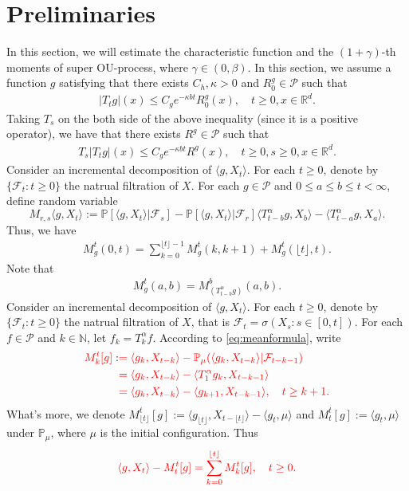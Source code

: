 \documentclass[12pt,oneside,english]{amsart}
\theoremstyle{plain}
\theoremstyle{definition}
\numberwithin{equation}{section}
\newcommand{\added}[1]{{\color{blue}#1}}\newcommand{\deleted}[1]{{\color{red}#1}}
\begin{document}
\section{Preliminaries}
    In this section, we will estimate the characteristic function and the $(1+\gamma)$-th moments of super OU-process, where $\gamma \in (0,\beta)$.
    \deleted{In this section, we assume a function $g$ satisfying that there exists $C_h, \kappa>0$ and $R^g_0\in \mathcal{P}$
    such that}
\deleted{\begin{align}\label{eq:gcontrol1}
    |T_tg|(x)
    \leq C_g e^{-\kappa bt}R^g_0(x),
    \quad t\geq 0,x\in \mathbb{R}^d.
\end{align}}
\deleted{Taking $T_s$ on the both side of the above inequality (since it is a positive operator), we have that there exists $R^g \in \mathcal P$ such that}
\deleted{\begin{align}\label{eq:gcontrol}
    T_s|T_t g|(x)
    \leq C_g e^{-\kappa bt} R^g(x),
    \quad t\geq 0,s\geq 0,x\in \mathbb{R}^d.
\end{align}}
\added{
    Consider an incremental decomposition of $\langle g,X_t \rangle$.
    For each $t\geq 0$, denote by $\{\mathcal{F}_t:t\geq 0\}$ the natrual filtration of $X$.
    For each $g\in \mathcal P$ and $0 \leq a \leq b \leq t <\infty$, define random variable
\[
    M_{r,s}\langle g,X_t\rangle   
    := \mathbb P[\langle g,X_t\rangle|\mathscr F_s] - \mathbb P[\langle g,X_t\rangle|\mathscr F_r]
    \langle T_{t-b}^\alpha g, X_b\rangle - \langle T_{t-a}^\alpha g, X_a\rangle.
\]
    Thus, we have
\begin{align}
    M^t_g(0,t)
    = \sum_{k = 0}^{\lfloor t \rfloor - 1} M^t_g(k,k+1) + M^t_g(\lfloor t \rfloor, t).
\end{align}
    Note that 
\begin{align}
    M_g^t(a,b) = M_{(T_{t-b}^\alpha g)}^b (a,b).
\end{align}
}
\deleted{
    Consider an incremental decomposition of $\langle g,X_t \rangle$.
    For each $t\geq 0$, denote by $\{\mathcal{F}_t:t\geq 0\}$ the natrual filtration of $X$, that is $\mathcal{F}_t=\sigma(X_s:s\in [0,t])$.
    For each $f\in\mathcal{P}$ and $k \in \mathbb{N}$, let $f_k=T^{\alpha}_k f$.
    According to \eqref{eq:meanformula}, write}
\begin{align*}
    \deleted{M_k^t[g]}:&
    \deleted{=\langle g_k, X_{t-k}\rangle-\mathbb{P}_{\mu}(\langle g_k,X_{t-k}\rangle|\mathcal{F}_{t-k-1})}\\
    &\deleted{=\langle g_k, X_{t-k}\rangle-\langle T_1^{\alpha}g_{k},X_{t-k-1}\rangle}\\
    &\deleted{=\langle g_k, X_{t-k}\rangle-\langle g_{k+1},X_{t-k-1}\rangle, \quad t\geq k+1.}
\end{align*}
    \deleted{What's more, we denote $M_{\lfloor t\rfloor}^t[g]:=\langle g_{\lfloor t \rfloor},X_{t-\lfloor t\rfloor}\rangle-\langle g_t, \mu\rangle$ and $M_t^t[g]:=\langle g_t,\mu\rangle$ under $\mathbb P_\mu$, where $\mu $ is the initial configuration. Thus}
\begin{equation}\label{decomposition}
    \deleted{\langle g,X_t\rangle-M_t^t[g]
    =\sum_{k=0}^{\lfloor t\rfloor}M_k^t[g]
    , \quad t \geq 0.}
\end{equation}
\end{document}
